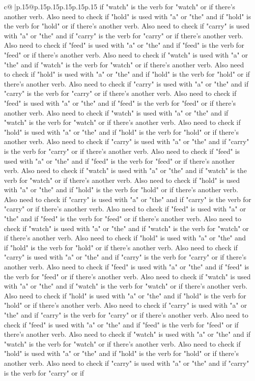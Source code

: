 \documentclass{article}
\begin{document}
{\begin{supertabular}{c@{$\;$}|p{.15\linewidth}@{}p{.15\linewidth}p{.15\linewidth}p{.15\linewidth}p{.15\linewidth}p{.15\linewidth}}
{{{if "watch" is the verb for "watch" or if there's another verb. Also need to check if "hold" is used with "a" or "the" and if "hold" is the verb for "hold" or if there's another verb. Also need to check if "carry" is used with "a" or "the" and if "carry" is the verb for "carry" or if there's another verb. Also need to check if "feed" is used with "a" or "the" and if "feed" is the verb for "feed" or if there's another verb. Also need to check if "watch" is used with "a" or "the" and if "watch" is the verb for "watch" or if there's another verb. Also need to check if "hold" is used with "a" or "the" and if "hold" is the verb for "hold" or if there's another verb. Also need to check if "carry" is used with "a" or "the" and if "carry" is the verb for "carry" or if there's another verb. Also need to check if "feed" is used with "a" or "the" and if "feed" is the verb for "feed" or if there's another verb. Also need to check if "watch" is used with "a" or "the" and if "watch" is the verb for "watch" or if there's another verb. Also need to check if "hold" is used with "a" or "the" and if "hold" is the verb for "hold" or if there's another verb. Also need to check if "carry" is used with "a" or "the" and if "carry" is the verb for "carry" or if there's another verb. Also need to check if "feed" is used with "a" or "the" and if "feed" is the verb for "feed" or if there's another verb. Also need to check if "watch" is used with "a" or "the" and if "watch" is the verb for "watch" or if there's another verb. Also need to check if "hold" is used with "a" or "the" and if "hold" is the verb for "hold" or if there's another verb. Also need to check if "carry" is used with "a" or "the" and if "carry" is the verb for "carry" or if there's another verb. Also need to check if "feed" is used with "a" or "the" and if "feed" is the verb for "feed" or if there's another verb. Also need to check if "watch" is used with "a" or "the" and if "watch" is the verb for "watch" or if there's another verb. Also need to check if "hold" is used with "a" or "the" and if "hold" is the verb for "hold" or if there's another verb. Also need to check if "carry" is used with "a" or "the" and if "carry" is the verb for "carry" or if there's another verb. Also need to check if "feed" is used with "a" or "the" and if "feed" is the verb for "feed" or if there's another verb. Also need to check if "watch" is used with "a" or "the" and if "watch" is the verb for "watch" or if there's another verb. Also need to check if "hold" is used with "a" or "the" and if "hold" is the verb for "hold" or if there's another verb. Also need to check if "carry" is used with "a" or "the" and if "carry" is the verb for "carry" or if there's another verb. Also need to check if "feed" is used with "a" or "the" and if "feed" is the verb for "feed" or if there's another verb. Also need to check if "watch" is used with "a" or "the" and if "watch" is the verb for "watch" or if there's another verb. Also need to check if "hold" is used with "a" or "the" and if "hold" is the verb for "hold" or if there's another verb. Also need to check if "carry" is used with "a" or "the" and if "carry" is the verb for "carry" or if }}}
\end{supertabular}}
\end{document}
